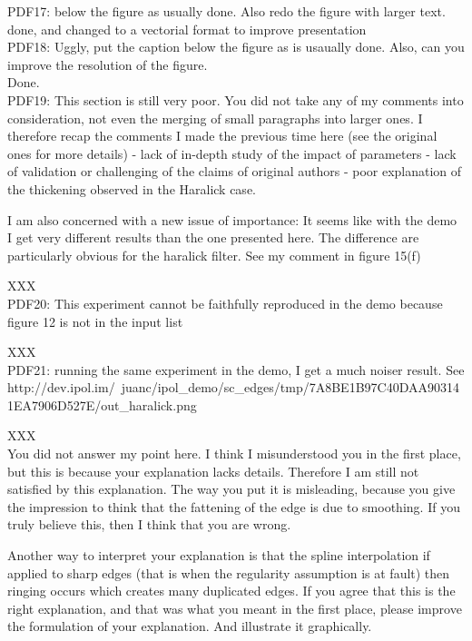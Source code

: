 \documentclass[a4paper,10pt]{report}
\begin{document}
\que PDF17: below the figure as usually done.
Also redo the figure with larger text.\\
\ans done, and changed to a vectorial format to improve presentation\\

\que PDF18: Uggly, put the caption below the figure as is usaually done. Also, can you improve the resolution of the figure.\\
\ans Done.\\

\que PDF19: This section is still very poor. 
You did not take any of my comments into consideration, not even the merging of small paragraphs into larger ones.
I therefore recap the comments I made the previous time here (see the original ones for more details)
-  lack of in-depth study of the impact of parameters
- lack of validation or challenging of the claims of original authors
- poor explanation of the thickening observed in the Haralick case.

I am also concerned with a new issue of importance: It seems like with the demo I get very different results  than the one presented here. The difference are particularly obvious for the haralick filter. See my comment in figure 15(f)

\ans XXX\\

\que PDF20: This experiment cannot be faithfully reproduced in the demo because figure 12 is not in the input list

\ans XXX\\

\que PDF21: running the same experiment in the demo, I get a much noiser result. See
http://dev.ipol.im/~juanc/ipol_demo/sc_edges/tmp/7A8BE1B97C40DAA903141EA7906D527E/out_haralick.png

\ans XXX\\

\que You did not answer my point here. I think I misunderstood you in the first place, but this is because your explanation lacks details. Therefore I am still not satisfied by this explanation. 
The way you put it is misleading, because you give the impression to think that the fattening of the edge is due to smoothing. If you truly believe this, then I think that you are wrong.

Another way to interpret your explanation is that the spline interpolation if applied to sharp edges (that is when the regularity assumption is at fault) then ringing occurs which creates many duplicated edges. If you agree that this is the right explanation, and that was what you meant in the first place, please improve the formulation of your explanation. And illustrate it graphically.
\end{document}
